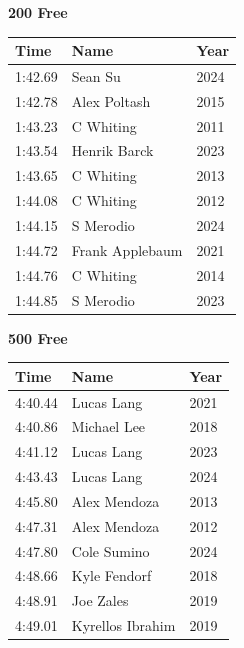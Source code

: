 \vspace{0.3em}
\vspace{1.2em}
\noindent\begin{minipage}[t]{0.48\textwidth}
\centering
\textbf{\textcolor{teamprimary}{200 Free}}\par
\vspace{0.5em}
\centering
\small
\renewcommand{\arraystretch}{1.0}
\setlength{\tabcolsep}{4pt}
\begin{tabular}{@{}p{1.8cm}p{3.0cm}p{1.0cm}@{}}
\toprule
\textbf{Time} & \textbf{Name} & \textbf{Year} \\
\midrule
1:42.69 & Sean Su & 2024 \\
1:42.78 & Alex Poltash & 2015 \\
1:43.23 & C Whiting & 2011 \\
1:43.54 & Henrik Barck & 2023 \\
1:43.65 & C Whiting & 2013 \\
1:44.08 & C Whiting & 2012 \\
1:44.15 & S Merodio & 2024 \\
1:44.72 & Frank Applebaum & 2021 \\
1:44.76 & C Whiting & 2014 \\
1:44.85 & S Merodio & 2023 \\
\bottomrule
\end{tabular}
\end{minipage}
\hfill
\begin{minipage}[t]{0.48\textwidth}
\centering
\textbf{\textcolor{teamprimary}{500 Free}}\par
\vspace{0.5em}
\centering
\small
\renewcommand{\arraystretch}{1.0}
\setlength{\tabcolsep}{4pt}
\begin{tabular}{@{}p{1.8cm}p{3.0cm}p{1.0cm}@{}}
\toprule
\textbf{Time} & \textbf{Name} & \textbf{Year} \\
\midrule
4:40.44 & Lucas Lang & 2021 \\
4:40.86 & Michael Lee & 2018 \\
4:41.12 & Lucas Lang & 2023 \\
4:43.43 & Lucas Lang & 2024 \\
4:45.80 & Alex Mendoza & 2013 \\
4:47.31 & Alex Mendoza & 2012 \\
4:47.80 & Cole Sumino & 2024 \\
4:48.66 & Kyle Fendorf & 2018 \\
4:48.91 & Joe Zales & 2019 \\
4:49.01 & Kyrellos Ibrahim & 2019 \\
\bottomrule
\end{tabular}
\end{minipage}
